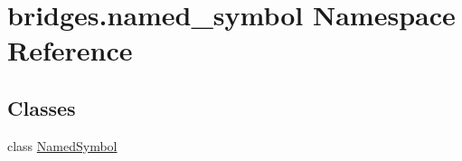 \hypertarget{namespacebridges_1_1named__symbol}{}\section{bridges.\+named\+\_\+symbol Namespace Reference}
\label{namespacebridges_1_1named__symbol}
\subsection*{Classes}
\begin{DoxyCompactItemize}
\item 
class \mbox{\hyperlink{classbridges_1_1named__symbol_1_1_named_symbol}{Named\+Symbol}}
\end{DoxyCompactItemize}
